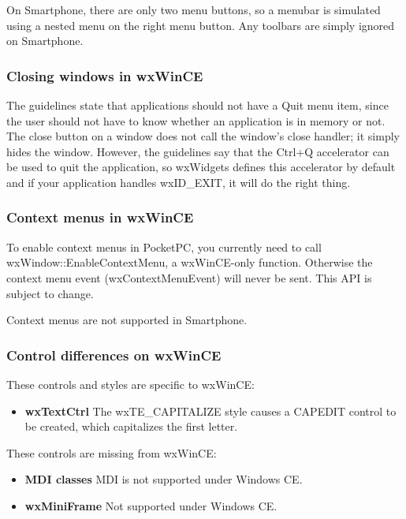 On Smartphone, there are only two menu buttons, so a menubar is simulated
using a nested menu on the right menu button. Any toolbars are simply ignored on
Smartphone.

\subsubsection{Closing windows in wxWinCE}

The guidelines state that applications should not have a Quit menu item,
since the user should not have to know whether an application is in memory
or not. The close button on a window does not call the window's
close handler; it simply hides the window. However, the guidelines say that
the Ctrl+Q accelerator can be used to quit the application, so wxWidgets
defines this accelerator by default and if your application handles
wxID\_EXIT, it will do the right thing.

\subsubsection{Context menus in wxWinCE}

To enable context menus in PocketPC, you currently need to call wxWindow::EnableContextMenu,
a wxWinCE-only function. Otherwise the context menu event (wxContextMenuEvent) will
never be sent. This API is subject to change.

Context menus are not supported in Smartphone.

\subsubsection{Control differences on wxWinCE}

These controls and styles are specific to wxWinCE:

\itemsep=0pt
\begin{itemize}
\item {\bf wxTextCtrl} The wxTE\_CAPITALIZE style causes a CAPEDIT control to
be created, which capitalizes the first letter.
\end{itemize}

These controls are missing from wxWinCE:

\itemsep=0pt
\begin{itemize}
\item {\bf MDI classes} MDI is not supported under Windows CE.
\item {\bf wxMiniFrame} Not supported under Windows CE.
\end{itemize}

